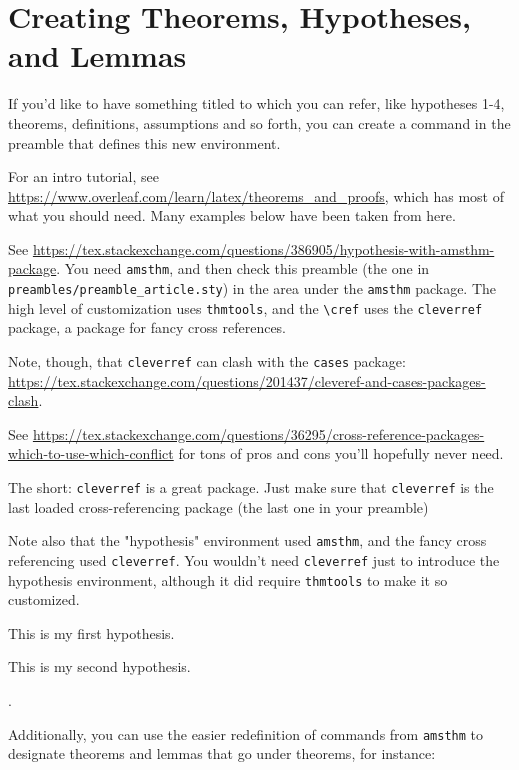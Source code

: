 \section{Creating Theorems, Hypotheses, and Lemmas}\label{sec:theorems-hypotheses}

If you'd like to have something titled to which you can refer, like hypotheses 1-4, theorems, definitions, assumptions and so forth, you can create a command in the preamble that defines this new environment. 

For an intro tutorial, see \url{https://www.overleaf.com/learn/latex/theorems_and_proofs}, which has most of what you should need. Many examples below have been taken from here.

See \url{https://tex.stackexchange.com/questions/386905/hypothesis-with-amsthm-package}. You need \verb+amsthm+, and then check this preamble (the one in \verb+preambles/preamble_article.sty+) in the area under the \verb+amsthm+ package. The high level of customization uses \verb+thmtools+, and the \verb+\cref+ uses the \verb+cleverref+ package, a package for fancy cross references. 

Note, though, that \verb+cleverref+ can clash with the \verb+cases+ package: \url{https://tex.stackexchange.com/questions/201437/cleveref-and-cases-packages-clash}. 

See \url{https://tex.stackexchange.com/questions/36295/cross-reference-packages-which-to-use-which-conflict} for tons of pros and cons you'll hopefully never need. 

The short: \verb+cleverref+ is a great package. Just make sure that \verb+cleverref+ is the last loaded cross-referencing package (the last one in your preamble)

Note also that the "hypothesis" environment used \verb+amsthm+, and the fancy cross referencing used \verb+cleverref+. You wouldn't need \verb+cleverref+ just to introduce the hypothesis environment, although it did require \verb+thmtools+ to make it so customized.

 \begin{hyp} \label{hyp:a}This is my first hypothesis. \end{hyp}
 \begin{hyp} \label{hyp:b}This is my second hypothesis. \end{hyp}

  .

Additionally, you can use the easier redefinition of commands from \verb+amsthm+ to designate theorems and lemmas that go under theorems, for instance:



